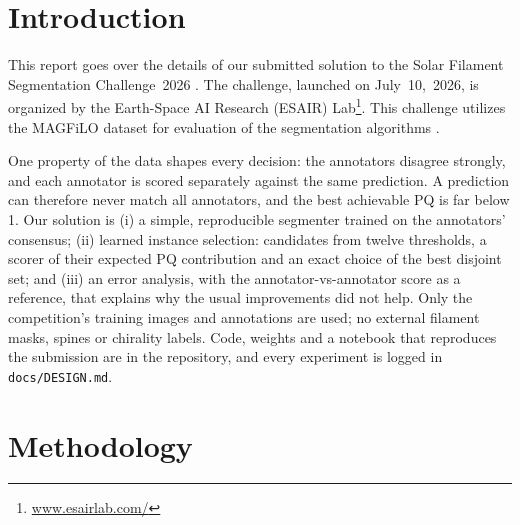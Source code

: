 \documentclass[sigconf]{acmart}
\begin{document}
\section{Introduction}
    This report goes over the details of our submitted solution to the Solar Filament Segmentation Challenge~2026 \cite{filament-segmentation-2026}. The challenge, launched on July~10,~2026, is organized by the Earth-Space AI Research (ESAIR) Lab\footnote{\href{https://www.esairlab.com/home}{www.esairlab.com/}}. This challenge utilizes the MAGFiLO dataset for evaluation of the segmentation algorithms \cite{ahmadzadeh2024dataset}.

    One property of the data shapes every decision: the annotators disagree strongly, and each annotator is scored separately against the same prediction. A prediction can therefore never match all annotators, and the best achievable PQ is far below 1. Our solution is (i) a simple, reproducible segmenter trained on the annotators' consensus; (ii) learned instance selection: candidates from twelve thresholds, a scorer of their expected PQ contribution and an exact choice of the best disjoint set; and (iii) an error analysis, with the annotator-vs-annotator score as a reference, that explains why the usual improvements did not help. Only the competition's training images and annotations are used; no external filament masks, spines or chirality labels. Code, weights and a notebook that reproduces the submission are in the repository, and every experiment is logged in \texttt{docs/DESIGN.md}.


\section{Methodology}\label{sec:methodology}
\end{document}
